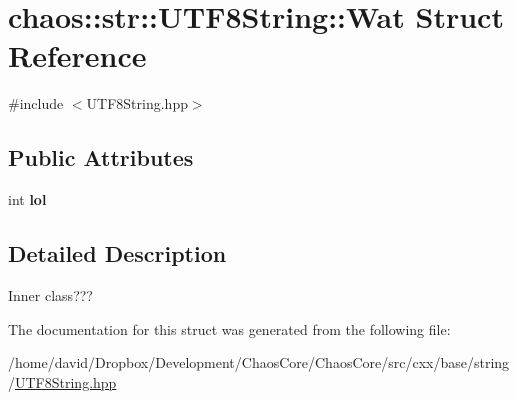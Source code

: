 \hypertarget{structchaos_1_1str_1_1_u_t_f8_string_1_1_wat}{\section{chaos\-:\-:str\-:\-:U\-T\-F8\-String\-:\-:Wat Struct Reference}
\label{structchaos_1_1str_1_1_u_t_f8_string_1_1_wat}
}


{\ttfamily \#include $<$U\-T\-F8\-String.\-hpp$>$}

\subsection*{Public Attributes}
\begin{DoxyCompactItemize}
\item 
\hypertarget{structchaos_1_1str_1_1_u_t_f8_string_1_1_wat_aca0223e02f96d6795e3b581a518525c7}{int {\bfseries lol}}\label{structchaos_1_1str_1_1_u_t_f8_string_1_1_wat_aca0223e02f96d6795e3b581a518525c7}

\end{DoxyCompactItemize}


\subsection{Detailed Description}
Inner class??? 

The documentation for this struct was generated from the following file\-:\begin{DoxyCompactItemize}
\item 
/home/david/\-Dropbox/\-Development/\-Chaos\-Core/\-Chaos\-Core/src/cxx/base/string/\hyperlink{_u_t_f8_string_8hpp}{U\-T\-F8\-String.\-hpp}\end{DoxyCompactItemize}
